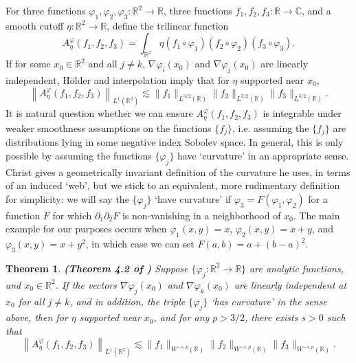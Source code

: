 \documentclass[12pt]{amsart}
\newtheorem{thm}{Theorem}
\def\C{\mathbb{C}}
\newcommand*{\R}{\mathbb{R}}
\begin{document}
For three functions $\varphi_1,\varphi_2,\varphi_3: \R^2 \to \R$, three functions $f_1,f_2,f_3: \R \to \C$, and a smooth cutoff $\eta: \R^2 \to \R$, define the trilinear function
%
\begin{equation}
    A^\varphi_\eta(f_1,f_2,f_3) = \int_{\R^2} \eta (f_1 \circ \varphi_1) (f_2 \circ \varphi_2) (f_3 \circ \varphi_3).
\end{equation}
%
If for some $x_0 \in \R^2$ and all $j \neq k$, $\nabla \varphi_i(x_0)$ and $\nabla \varphi_j(x_0)$ are linearly independent, H\"{o}lder and interpolation imply that for $\eta$ supported near $x_0$,
%
\begin{equation}
    \left\| A^\varphi_\eta(f_1,f_2,f_3) \right\|_{L^1(\R^2)} \lesssim \| f_1 \|_{L^{3/2}(\R)} \| f_2 \|_{L^{3/2}(\R)} \| f_3 \|_{L^{3/2}(\R)}.
\end{equation}
%
It is natural question whether we can ensure $A^\varphi_\eta(f_1,f_2,f_3)$ is integrable under weaker smoothness assumptions on the functions $\{ f_j \}$, i.e. assuming the $\{ f_j \}$ are distributions lying in some negative index Sobolev space. In general, this is only possible by assuming the functions $\{ \varphi_j \}$ have `curvature' in an appropriate sense. Christ gives a geometrically invariant definition of the curvature he uses, in terms of an induced `web', but we stick to an equivalent, more rudimentary definition for simplicity: we will say the $\{ \varphi_j \}$ `have curvature' if $\varphi_3 = F(\varphi_1, \varphi_2)$ for a function $F$ for which $\partial_1 \partial_2 F$ is non-vanishing in a neighborhood of $x_0$. The main example for our purposes occurs when $\varphi_1(x,y) = x$, $\varphi_2(x,y) = x + y$, and $\varphi_3(x,y) = x + y^2$, in which case we can set $F(a,b) = a + (b - a)^2$.

\begin{thm} \label{TheoremFourPointTwojdmrc} \textbf{(Theorem 4.2 of \cite{ChristTopicPaperjdmrc})}
    Suppose $\{ \varphi_j: \R^2 \to \R \}$ are analytic functions, and $x_0 \in \R^2$. If the vectors $\nabla \varphi_j(x_0)$ and $\nabla \varphi_k(x_0)$ are linearly independent at $x_0$ for all $j \neq k$, and in addition, the triple $\{ \varphi_j \}$ `has curvature' in the sense above, then for $\eta$ supported near $x_0$, and for any $p > 3/2$, there exists $s > 0$ such that
    \begin{equation}
        \left\| A^\varphi_\eta(f_1,f_2,f_3) \right\|_{L^1(\R^2)} \lesssim \| f_1 \|_{W^{-s,p}(\R)} \| f_2 \|_{W^{-s,p}(\R)} \| f_3 \|_{W^{-s,p}(\R)}.
    \end{equation}
\end{thm}
\end{document}
